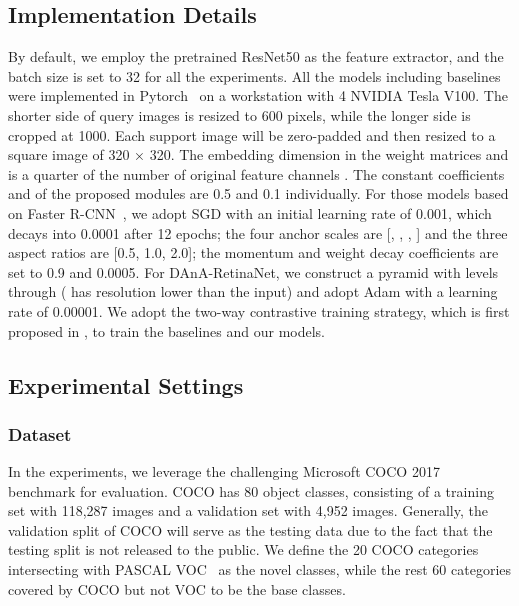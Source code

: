 \documentclass[journal]{IEEEtran}
\begin{document}
\subsection{Implementation Details}
By default, we employ the pretrained ResNet50 as the feature extractor, and the batch size is set to 32 for all the experiments.
All the models including baselines were implemented in Pytorch~\cite{paszke2017automatic} on a workstation with 4 NVIDIA Tesla V100.
The shorter side of query images is resized to 600 pixels, while the longer side is cropped at 1000. 
Each support image will be zero-padded and then resized to a square image of 320 × 320.
The embedding dimension  in the weight matrices  and  is a quarter of the number of original feature channels . 
The constant coefficients  and  of the proposed modules are 0.5 and 0.1 individually.
For those models based on Faster R-CNN~\cite{ren2015faster}, we adopt SGD with an initial learning rate of 0.001, which decays into 0.0001 after 12 epochs; the four anchor scales are [, , , ] and the three aspect ratios are [0.5, 1.0, 2.0]; the momentum and weight decay coefficients are set to 0.9 and 0.0005.
For DAnA-RetinaNet, we construct a pyramid with levels  through  ( has resolution  lower than the input) and adopt Adam with a learning rate of 0.00001.
We adopt the two-way contrastive training strategy, which is first proposed in \cite{fan2020few}, to train the baselines and our models.






\subsection{Experimental Settings}
\subsubsection{Dataset}
\label{section:dataset}
In the experiments, we leverage the challenging Microsoft COCO 2017~\cite{lin2014microsoft} benchmark for evaluation.
COCO has 80 object classes, consisting of a training set with 118,287 images and a validation set with 4,952 images.
Generally, the validation split of COCO will serve as the testing data due to the fact that the testing split is not released to the public.
We define the 20 COCO categories intersecting with PASCAL VOC~\cite{everingham2010pascal} as the novel classes, while the rest 60 categories covered by COCO but not VOC to be the base classes.
\end{document}
